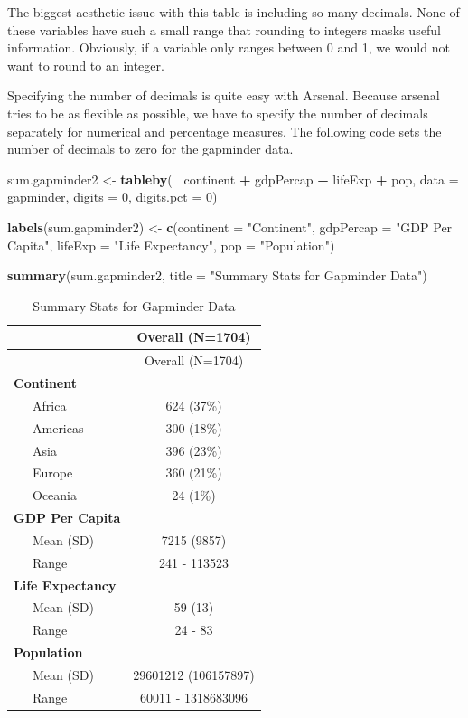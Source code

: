 \documentclass[
]{book}
\newenvironment{Shaded}{\begin{snugshade}}{\end{snugshade}}
\newcommand{\DataTypeTok}[1]{\textcolor[rgb]{0.13,0.29,0.53}{#1}}
\newcommand{\DecValTok}[1]{\textcolor[rgb]{0.00,0.00,0.81}{#1}}
\newcommand{\KeywordTok}[1]{\textcolor[rgb]{0.13,0.29,0.53}{\textbf{#1}}}
\newcommand{\NormalTok}[1]{#1}
\newcommand{\OperatorTok}[1]{\textcolor[rgb]{0.81,0.36,0.00}{\textbf{#1}}}
\newcommand{\StringTok}[1]{\textcolor[rgb]{0.31,0.60,0.02}{#1}}
\begin{document}
The biggest aesthetic issue with this table is including so many decimals. None of these variables have such a small range that rounding to integers masks useful information. Obviously, if a variable only ranges between 0 and 1, we would not want to round to an integer.

Specifying the number of decimals is quite easy with Arsenal. Because arsenal tries to be as flexible as possible, we have to specify the number of decimals separately for numerical and percentage measures. The following code sets the number of decimals to zero for the gapminder data.

\begin{Shaded}
\begin{Highlighting}[]
\NormalTok{sum.gapminder2 <-}\StringTok{ }\KeywordTok{tableby}\NormalTok{(}\OperatorTok{~}\StringTok{ }\NormalTok{continent }\OperatorTok{+}\StringTok{ }\NormalTok{gdpPercap }\OperatorTok{+}\StringTok{ }\NormalTok{lifeExp }\OperatorTok{+}\StringTok{ }\NormalTok{pop, }\DataTypeTok{data =}\NormalTok{ gapminder, }\DataTypeTok{digits =} \DecValTok{0}\NormalTok{, }\DataTypeTok{digits.pct =} \DecValTok{0}\NormalTok{)}

\KeywordTok{labels}\NormalTok{(sum.gapminder2) <-}\StringTok{ }\KeywordTok{c}\NormalTok{(}\DataTypeTok{continent =} \StringTok{"Continent"}\NormalTok{, }\DataTypeTok{gdpPercap =} \StringTok{"GDP Per Capita"}\NormalTok{, }\DataTypeTok{lifeExp =} \StringTok{"Life Expectancy"}\NormalTok{, }\DataTypeTok{pop =} \StringTok{"Population"}\NormalTok{)}
\end{Highlighting}
\end{Shaded}

\begin{Shaded}
\begin{Highlighting}[]
\KeywordTok{summary}\NormalTok{(sum.gapminder2, }\DataTypeTok{title =} \StringTok{"Summary Stats for Gapminder Data"}\NormalTok{)}
\end{Highlighting}
\end{Shaded}

\begin{longtable}[]{@{}lc@{}}
\caption{Summary Stats for Gapminder Data}\tabularnewline
\toprule
& Overall (N=1704)\tabularnewline
\midrule
\endfirsthead
\toprule
& Overall (N=1704)\tabularnewline
\midrule
\endhead
\textbf{Continent} &\tabularnewline
~~~Africa & 624 (37\%)\tabularnewline
~~~Americas & 300 (18\%)\tabularnewline
~~~Asia & 396 (23\%)\tabularnewline
~~~Europe & 360 (21\%)\tabularnewline
~~~Oceania & 24 (1\%)\tabularnewline
\textbf{GDP Per Capita} &\tabularnewline
~~~Mean (SD) & 7215 (9857)\tabularnewline
~~~Range & 241 - 113523\tabularnewline
\textbf{Life Expectancy} &\tabularnewline
~~~Mean (SD) & 59 (13)\tabularnewline
~~~Range & 24 - 83\tabularnewline
\textbf{Population} &\tabularnewline
~~~Mean (SD) & 29601212 (106157897)\tabularnewline
~~~Range & 60011 - 1318683096\tabularnewline
\bottomrule
\end{longtable}
\end{document}
